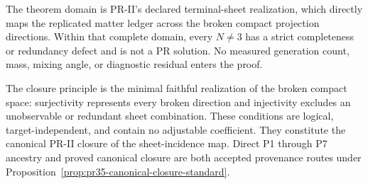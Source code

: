 The theorem domain is PR-II's declared terminal-sheet realization, which directly maps the replicated matter ledger across the broken compact projection directions.  Within that complete domain, every $N\ne3$ has a strict completeness or redundancy defect and is not a PR solution.  No measured generation count, mass, mixing angle, or diagnostic residual enters the proof.

The closure principle is the minimal faithful realization of the broken compact space: surjectivity represents every broken direction and injectivity excludes an unobservable or redundant sheet combination.  These conditions are logical, target-independent, and contain no adjustable coefficient.  They constitute the canonical PR-II closure of the sheet-incidence map.  Direct P1 through P7 ancestry and proved canonical closure are both accepted provenance routes under Proposition~\ref{prop:pr35-canonical-closure-standard}.
